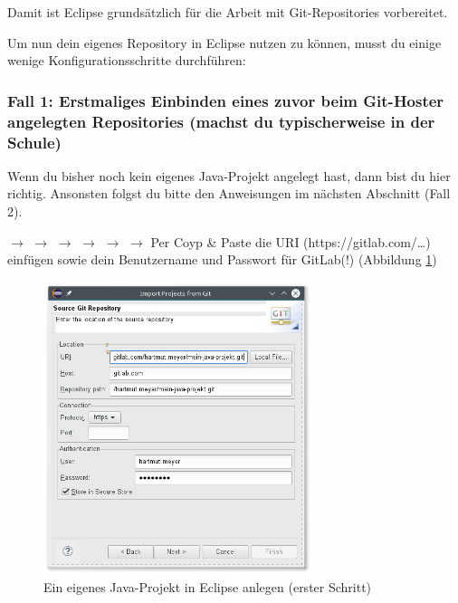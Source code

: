 
\afterpage{\clearpage}

Damit ist Eclipse grundsätzlich für die Arbeit mit Git-Repositories vorbereitet.

Um nun dein eigenes Repository in Eclipse nutzen zu können, musst du einige
wenige Konfigurationsschritte durchführen:

\subsubsection{Fall 1: Erstmaliges Einbinden eines zuvor beim Git-Hoster
angelegten Repositories (machst du typischerweise in der Schule)}

Wenn du bisher noch kein eigenes Java-Projekt angelegt hast, dann bist du hier
richtig. Ansonsten folgst du bitte den Anweisungen im nächsten Abschnitt
(Fall 2).

 $\rightarrow$  $\rightarrow$ 
$\rightarrow$  $\rightarrow$  $\rightarrow$
 $\rightarrow$  Per Coyp \& Paste die URI
(https://gitlab.com/\ldots) einfügen sowie dein Benutzername und Passwort für
GitLab(!) (Abbildung \ref{fig:import-project-from-git})

\begin{figure}[h]
  \centering
   \includegraphics[width=0.70\textwidth]{./inf/SEKII/01_Vorbereitung/Import_Project_from_Git.png}
   \caption{Ein eigenes Java-Projekt in Eclipse anlegen (erster Schritt)}
   \label{fig:import-project-from-git}
\end{figure}

